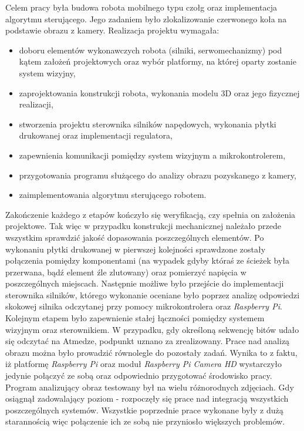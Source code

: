 Celem pracy była budowa robota mobilnego typu czołg oraz implementacja algorytmu sterującego. Jego zadaniem było zlokalizowanie czerwonego koła na podstawie obrazu z kamery. Realizacja projektu wymagała:
\begin{itemize}
\item doboru elementów wykonawczych robota (silniki, serwomechanizmy) pod kątem założeń projektowych oraz wybór platformy, na której oparty zostanie system wizyjny,
\item zaprojektowania konstrukcji robota, wykonania modelu 3D oraz jego fizycznej realizacji,
\item stworzenia projektu sterownika silników napędowych, wykonania płytki drukowanej oraz implementacji regulatora,
\item zapewnienia komunikacji pomiędzy system wizyjnym a mikrokontrolerem,
\item przygotowania programu służącego do analizy obrazu pozyskanego z kamery,
\item zaimplementowania algorytmu sterującego robotem.
\end{itemize}

Zakończenie każdego z etapów kończyło się weryfikacją, czy spełnia on założenia projektowe. Tak więc w przypadku konstrukcji mechanicznej należało przede wszystkim sprawdzić jakość dopasowania poszczególnych elementów. Po wykonaniu płytki drukowanej w pierwszej kolejności sprawdzone zostały połączenia pomiędzy komponentami (na wypadek gdyby któraś ze ścieżek była przerwana, bądź element źle zlutowany) oraz pomierzyć napięcia w poszczególnych miejscach. Następnie możliwe było przejście do implementacji sterownika silników, którego wykonanie oceniane było poprzez analizę odpowiedzi skokowej silnika odczytanej przy pomocy mikrokontrolera oraz \textit{Raspberry Pi}. Kolejnym etapem było zapewnienie stałej łączności pomiędzy systemem wizyjnym oraz sterownikiem. W przypadku, gdy określoną sekwencję bitów udało się odczytać na Atmedze, podpunkt uznano za zrealizowany. Prace nad analizą obrazu można było prowadzić równolegle do pozostały zadań. Wynika to z faktu, iż platformę \textit{Raspberry Pi} oraz moduł \textit{Raspberry Pi Camera HD} wystarczyło jedynie połączyć ze sobą oraz odpowiednio przygotować środowisko pracy. Program analizujący obraz testowany był na wielu różnorodnych zdjęciach. Gdy osiągnął zadowalający poziom - rozpoczęły się prace nad integracją wszystkich poszczególnych systemów. Wszystkie poprzednie prace wykonane były z dużą starannością więc połączenie ich ze sobą nie przyniosło większych problemów.


